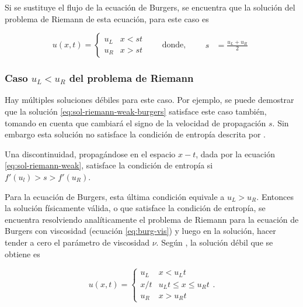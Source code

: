 \documentclass[12pt]{article}
\begin{document}
	Si se sustituye el flujo de la ecuación de Burgers, se encuentra que la solución del problema de Riemann de esta ecuación, para este caso es 
	
	\begin{equation}
		u(x,t) =
		\begin{cases}
			u_{L} & x < st \\
			u_{R} & x > st
		\end{cases}
		\qquad \text{donde,}
		\qquad
		\begin{aligned}
			s &= \frac{u_{L} + u_{R}}{2}
		\end{aligned}
		\label{eq:sol-riemann-weak-burgers}
	\end{equation}

	\subsubsection{Caso $u_L < u_R$ del problema de Riemann}
	
	Hay múltiples soluciones débiles para este caso. Por  ejemplo, se puede demostrar que la solución \ref{eq:sol-riemann-weak-burgers} satisface este caso también, tomando en cuenta que cambiará el signo de la velocidad de propagación $s$. Sin embargo esta solución no satisface la condición de entropía descrita por \cite{Cameron}.
	
	\begin{definition}
		Una discontinuidad, propagándose en el espacio $x-t$, dada por la ecuación \ref{eq:sol-riemann-weak}, satisface la condición de entropía si $f'(u_l)>s>f'(u_R)$.
	\end{definition}
	 Para la ecuación de Burgers, esta última condición equivale a $u_L > u_R$. Entonces la solución físicamente válida, o que satisface la condición de entropía, se encuentra resolviendo analíticamente el problema de Riemann para la ecuación de Burgers con viscosidad (ecuación \ref{eq:burg-vis}) y luego en la solución, hacer tender a cero el parámetro de viscosidad $\nu$. Según \cite{Cameron}, la solución débil que se obtiene es
 	
 	\begin{equation}
 		u(x,t) =
 		\begin{cases}
 			u_{L} & x < u_{L}t \\
 			x/t & u_{L}t \leq x \leq u_{R}t \\
 			u_{R} & x > u_{R}t
 		\end{cases}.
 		\label{eq:sol-riemann-weak-rarefraction}
 	\end{equation}
 
\end{document}

